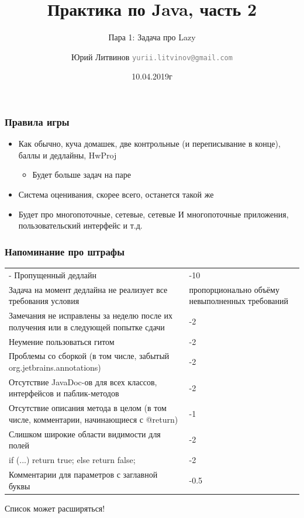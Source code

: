\documentclass[xetex,mathserif,serif]{beamer}
\title{Практика по Java, часть 2}
\subtitle{Пара 1: Задача про Lazy}
\author[Юрий Литвинов]{Юрий Литвинов \newline \textcolor{gray}{\small\texttt{yurii.litvinov@gmail.com}}}
\date{10.04.2019г}
\begin{document}
	
	\frame{\titlepage}
	
	\begin{frame}
		\frametitle{Правила игры}
		\begin{itemize}
			\item Как обычно, куча домашек, две контрольные (и переписывание в конце), баллы и дедлайны, HwProj
			\begin{itemize}
				\item Будет больше задач на паре
			\end{itemize}
			\item Система оценивания, скорее всего, останется такой же
			\item Будет про многопоточные, сетевые, сетевые И многопоточные приложения, пользовательский интерфейс и т.д.
		\end{itemize}
	\end{frame}

	\begin{frame}
		\frametitle{Напоминание про штрафы}
		\begin{scriptsize}
			\begin{tabu} {| X[1 l p] | X[0.3 l p] |}
				\tabucline-
				\everyrow{\tabucline-}
				Пропущенный дедлайн                                                                   & -10 \\
				Задача на момент дедлайна не реализует все требования условия                         & пропорционально объёму невыполненных требований \\
				Замечания не исправлены за неделю после их получения или в следующей попытке сдачи    & -2 \\
				Неумение пользоваться гитом                                                           & -2 \\
				Проблемы со сборкой (в том числе, забытый org.jetbrains.annotations)                  & -2 \\
				Отсутствие JavaDoc-ов для всех классов, интерфейсов и паблик-методов                  & -2 \\
				Отсутствие описания метода в целом (в том числе, комментарии, начинающиеся с @return) & -1 \\
				Слишком широкие области видимости для полей                                           & -2 \\
				if (...) return true; else return false;                                              & -2 \\
				Комментарии для параметров с заглавной буквы                                          & -0.5 \\
			\end{tabu}
		\end{scriptsize}
		\begin{center}
			\scriptsize{Список может расширяться!}
		\end{center}
	\end{frame}
\end{document}
